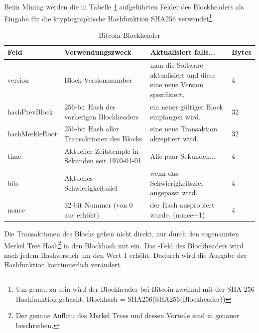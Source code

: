 Beim Mining werden die in Tabelle \ref{tab:btc_block_header} aufgeführten Felder des Blockheaders als Eingabe für die kryptographische Hashfunktion SHA256 verwendet\footnote{Um genau zu sein wird der Blockheader bei Bitcoin zweimal mit der SHA 256 Hashfunktion gehasht. Blockhash = SHA256(SHA256(Blockheader))}.
\begin{table}[H]
\centering
\caption{Bitcoin Blockheader}
\label{tab:btc_block_header}
\begin{tabular}{|l|p{}|p{}|l|}
\hline
\textbf{Feld}  & \textbf{Verwendungszweck}                         & \textbf{Aktualisiert falls...}                                          & \textbf{Bytes} \\ \hline
version        & Block Versionsnumber                             & man die Software aktualisiert und diese eine neue Version spezifiziert. & 4              \\ \hline
hashPrevBlock  & 256-bit Hash des vorherigen Blockheaders          & ein neuer gültiger Block empfangen wird.                                & 32             \\ \hline
hashMerkleRoot & 256-bit Hash aller Transaktionen des Blocks       & eine neue Transaktion akzeptiert wird.                                  & 32             \\ \hline
time           & Aktueller Zeitstemple in Sekunden seit 1970-01-01 & Alle paar Sekunden...                                                   & 4              \\ \hline
bits           & Aktuelles Schwierigkeitsziel                      & wenn das Schwierigkeitsziel angepasst wird.                             & 4              \\ \hline
nonce          & 32-bit Nummer (von 0 aus erhöht)                  & der Hash ausprobiert wurde. (nonce+1)                                   & 4              \\ \hline
\end{tabular}
\end{table}
Die Transaktionen des Blocks gehen nicht direkt, nur durch den sogenannten Merkel Tree Hash\footnote{Der genaue Aufbau des Merkel Trees und dessen Vorteile sind in \cite{bitcoin_white_paper} genauer beschrieben.} in den Blockhash mit ein. Das -Feld des Blockheaders wird nach jedem Hashversuch um den Wert 1 erhöht. Dadurch wird die Ausgabe der Hashfunktion kontinuierlich verändert.

